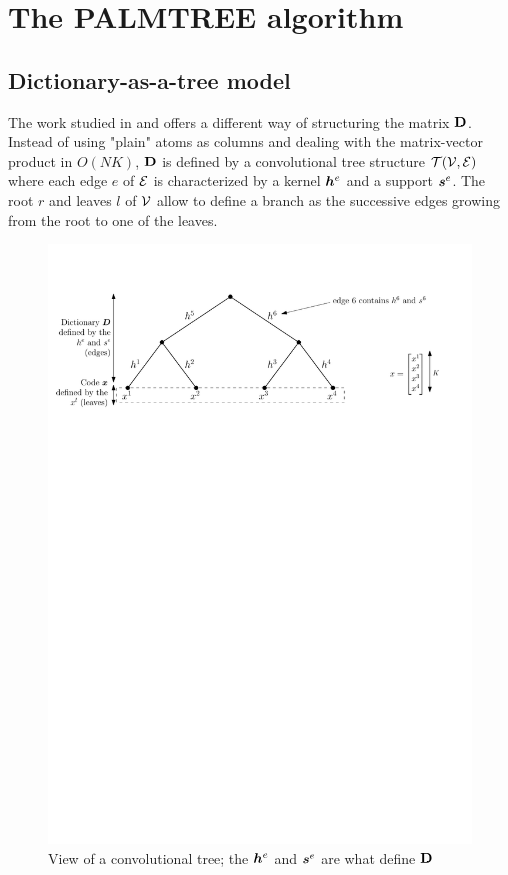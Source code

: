 \section{The PALMTREE algorithm}

\subsection{Dictionary-as-a-tree model \label{sec_tree_model}}
The work studied in \cite{chabiron_toward_2015} and \cite{chabiron_optimization_2016} offers a different way of structuring the matrix $\mathbf{D}$. Instead of using "plain" atoms as columns and dealing with the matrix-vector product in $O(NK)$, $\mathbf{D}$ is defined by a convolutional tree structure $\mathcal T(\mathcal V,\mathcal E)$ where each edge $e$ of $\mathcal E$ is characterized by a kernel $\bm{h}^e$ and a support $\bm{s}^e$. The root $r$ and leaves $l$ of $\mathcal V$ allow to define a branch as the successive edges growing from the root to one of the leaves.

\begin{figure}[!ht]\centering
\includegraphics[width=\textwidth]{figures/tree.pdf}
\caption{View of a convolutional tree; the $\bm{h}^e$ and $\bm{s}^e$ are what define $\mathbf{D}$}\label{fig_tree}
\end{figure}

